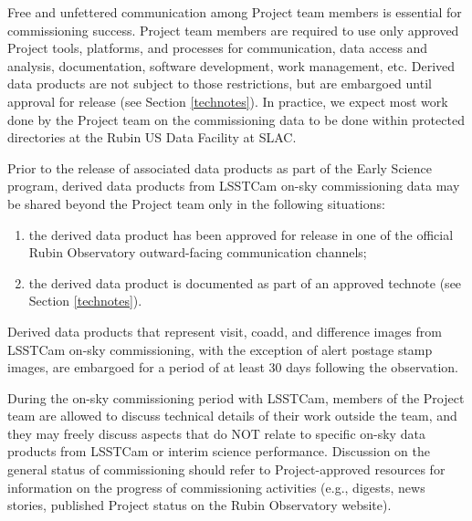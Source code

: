 \documentclass[SE,authoryear,toc,lsstdraft]{lsstdoc}
\begin{document}
Free and unfettered communication among Project team members is essential for commissioning success.
Project team members are required to use only approved Project tools, platforms, and processes for communication, data access and analysis, documentation, software development, work management, etc.
Derived data products are not subject to those restrictions, but are embargoed until approval for release (see Section \ref{technotes}).
In practice, we expect most work done by the Project team on the commissioning data to be done within protected directories at the Rubin US Data Facility at SLAC.

Prior to the release of associated data products as part of the Early Science program, derived data products from LSSTCam on-sky commissioning data may be shared beyond the Project team only in the following situations:

\begin{enumerate}

  \item the derived data product has been approved for release in one of the official Rubin Observatory outward-facing communication channels;

  \item the derived data product is documented as part of an approved technote (see Section \ref{technotes}).

\end{enumerate}

Derived data products that represent visit, coadd, and difference images from LSSTCam on-sky commissioning, with the exception of alert postage stamp images, are embargoed for a period of at least 30 days following the observation.


During the on-sky commissioning period with LSSTCam, members of the Project team are allowed to discuss technical details of their work outside the team, and they may freely discuss aspects that do NOT relate to specific on-sky data products from LSSTCam or interim science performance.
Discussion on the general status of commissioning should refer to Project-approved resources for information on the progress of commissioning activities (e.g., digests, news stories, published Project status on the Rubin Observatory website).
\end{document}
